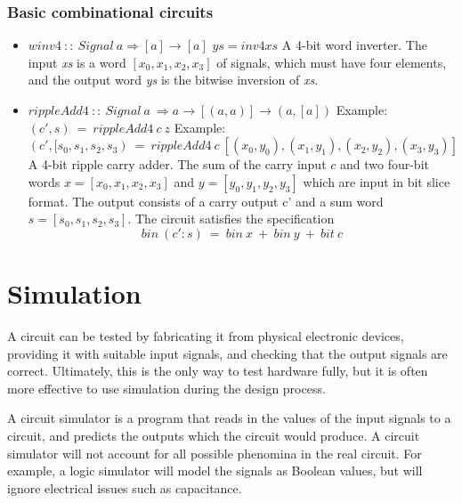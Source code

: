 \documentclass[a4paper,openany,fleqn]{book}
\begin{document}
\subsection{Basic combinational circuits}
\label{sec:basic-comb-circ}

\begin{itemize}
  
\item $\mathit{winv4}\ ::\ \mathit{Signal}\ a \Rightarrow [a]
  \rightarrow [a]$ \hfill\break $ys = inv4 xs$ \hfill\break A 4-bit
  word inverter.  The input \textit{xs} is a word $[x_0,x_1,x_2,x_3]$
  of signals, which must have four elements, and the output word
  \textit{ys} is the bitwise inversion of \textit{xs}.

\item $\textit{rippleAdd4}\ ::\ \textit{Signal}\ a\ \Rightarrow
     a \rightarrow [(a,a)] \rightarrow (a,[a]) $ \hfill\break
  Example: $(c',s)\ =\ \textit{rippleAdd4}\ c\ \textit{z}$ \hfill\break
  Example: $(c',[s_0, s_1, s_2, s_3)\ =\ \textit{rippleAdd4}\ c
    \ [(x_0,y_0), (x_1,y_1), (x_2,y_2), (x_3,y_3)]$ \hfill\break
  A 4-bit ripple carry adder.  The sum of the carry input $c$ and two
  four-bit words $x = [x_0, x_1, x_2, x_3]$ and $y = [y_0, y_1, y_2, y_3]$
  which are input in bit slice format.  The output consists of a carry
  output c' and a sum word $s = [s_0, s_1, s_2, s_3]$.  The circuit
  satisfies the specification
     \[\textit{bin}\ (c':s)\ =\ \textit{bin}\ x\ +\ \textit{bin}\ y\ 
     +\ \textit{bit}\ c\]

\end{itemize}

\chapter{Simulation}
\label{sec:simulation}

A circuit can be tested by fabricating it from physical electronic
devices, providing it with suitable input signals, and checking that
the output signals are correct.  Ultimately, this is the only way to
test hardware fully, but it is often more effective to use simulation
during the design process.

A circuit simulator is a program that reads in the values of the input
signals to a circuit, and predicts the outputs which the circuit would
produce.  A circuit simulator will not account for all possible
phenomina in the real circuit.  For example, a logic simulator will
model the signals as Boolean values, but will ignore electrical issues
such as capacitance.
\end{document}
